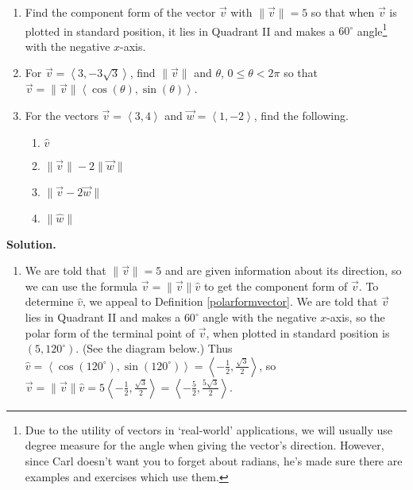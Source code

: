 \begin{ex} \label{polarformvecex} $~$

\begin{enumerate}

\item \label{resolvecomponents} Find the component form of the vector $\vec{v}$ with $\|\vec{v}\| = 5$ so that when $\vec{v}$ is plotted in standard position, it lies in Quadrant II and makes a $60^{\circ}$ angle\footnote{Due to the utility of vectors in `real-world' applications, we will usually use degree measure for the angle when giving the vector's direction.  However, since Carl doesn't want you to forget about radians, he's made sure there are examples and exercises which use them.} with the negative $x$-axis.

\item  For $\vec{v} = \left<3, -3\sqrt{3}\right>$, find $\|\vec{v}\|$ and $\theta$, $0 \leq \theta < 2\pi$ so that $\vec{v} = \| \vec{v} \| \left<\cos(\theta), \sin(\theta)\right>$.

\item For the vectors $\vec{v} = \left<3,4\right>$ and $\vec{w} = \left<1, -2\right>$, find the following.

\begin{multicols}{4}

\begin{enumerate}

\item  $\hat{v}$

\item  $\| \vec{v} \| -2 \|\vec{w}\|$

\item  $\| \vec{v} -2\vec{w}\|$

\item  $\| \hat{w} \|$ \label{preludetounitvector}

\end{enumerate}

\end{multicols}

\end{enumerate}

{\bf Solution.}

\begin{enumerate}

\item  We are told that $\| \vec{v} \| = 5$ and are given information about its direction, so we can use the formula $\vec{v} = \| \vec{v} \| \hat{v}$ to get the component form of $\vec{v}$.  To determine $\hat{v}$, we appeal to Definition \ref{polarformvector}.  We are told that $\vec{v}$ lies in Quadrant II and makes a  $60^{\circ}$ angle with the negative $x$-axis, so the polar form of the terminal point of $\vec{v}$, when plotted in standard position is $\left(5, 120^{\circ}\right)$. (See the diagram below.) Thus $\hat{v} = \left< \cos\left(120^{\circ}\right), \sin\left(120^{\circ}\right) \right> = \left< - \frac{1}{2} , \frac{\sqrt{3}}{2} \right>$, so  $\vec{v} = \| \vec{v} \| \hat{v} = 5  \left< - \frac{1}{2} , \frac{\sqrt{3}}{2} \right> =  \left< - \frac{5}{2} , \frac{5\sqrt{3}}{2} \right>$.


\end{enumerate}
\end{ex}
